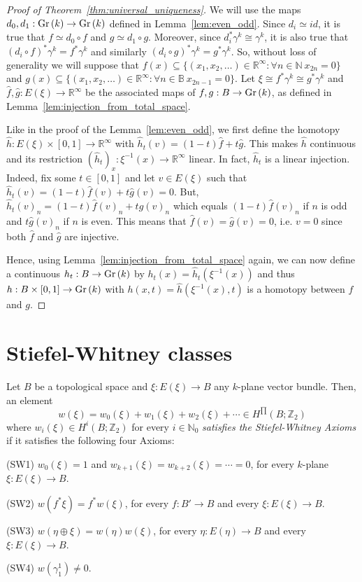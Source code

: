 \begin{proof}[Proof of Theorem~\ref{thm:universal_uniqueness}] We will use the maps $d_0,d_1:\Gr{k}\to\Gr{k}$ defined in Lemma~\ref{lem:even_odd}. Since $d_i\simeq id$, it is true that $f\simeq d_0\circ f$ and $g\simeq d_1\circ g$. Moreover, since $d_i^*\gamma^k\cong\gamma^k$, it is also true that $(d_i\circ f)^*\gamma^k=f^*\gamma^k$ and similarly $(d_i\circ g)^*\gamma^k=g^*\gamma^k$. So, without loss of generality we will suppose that $f(x)\subseteq\{(x_1,x_2,\ldots)\in\mathbb{R}^{\infty}:\forall n\in\mathbb{N}\ x_{2n}=0\}$ and $g(x)\subseteq\{(x_1,x_2,\ldots)\in\mathbb{R}^{\infty}:\forall n\in\mathbb{B}\ x_{2n-1}=0\}$. Let $\xi\cong f^*\gamma^k\cong g^*\gamma^k$ and $\hat{f},\hat{g}:E(\xi)\to\mathbb{R}^{\infty}$ be the associated maps of $f,g:B\to\Gr{k}$, as defined in Lemma~\ref{lem:injection_from_total_space}.

Like in the proof of the Lemma~\ref{lem:even_odd}, we first define the homotopy $\hat{h}:E(\xi)\times[0,1]\to\mathbb{R}^{\infty}$ with $\hat{h}_t(v)=(1-t)\hat{f}+t\hat{g}$. This makes $\hat{h}$ continuous and its restriction $(\hat{h}_t)_x:\xi^{-1}(x)\to\mathbb{R}^{\infty}$ linear. In fact, $\hat{h}_t$ is a linear injection. Indeed, fix some $t\in[0,1]$ and let $v\in E(\xi)$ such that $\hat{h}_t(v)=(1-t)\hat{f}(v)+t\hat{g}(v)=0$. But, $\hat{h}_t(v)_n=(1-t)\hat{f}(v)_n+t\hat{g}(v)_n$ which equals $(1-t)\hat{f}(v)_n$ if $n$ is odd and $t\hat{g}(v)_n$ if $n$ is even. This means that $\hat{f}(v)=\hat{g}(v)=0$, i.e. $v=0$ since both $\hat{f}$ and $\hat{g}$ are injective.

Hence, using Lemma~\ref{lem:injection_from_total_space} again, we can now define a continuous $h_t:B\to\Gr{k}$ by $h_t(x)=\hat{h}_t(\xi^{-1}(x))$ and thus $h:B\times[0,1]\to\Gr{k}$ with $h(x,t)=\hat{h}(\xi^{-1}(x),t)$ is a homotopy between $f$ and $g$.
\end{proof}

\section{Stiefel-Whitney classes}
\begin{axioms} Let $B$ be a topological space and $\xi:E(\xi)\to B$ any $k$-plane vector bundle. Then, an element
\[w(\xi)=w_0(\xi)+w_1(\xi)+w_2(\xi)+\cdots\in H^{\prod}(B;\mathbb{Z}_2)\]
where $w_i(\xi)\in H^i(B;\mathbb{Z}_2)$ for every $i\in\mathbb{N}_0$ \emph{satisfies the Stiefel-Whitney Axioms} if it satisfies the following four Axioms:
\begin{b_item}
\item[(SW1)] $w_0(\xi)=1$ and $w_{k+1}(\xi)=w_{k+2}(\xi)=\cdots=0$, for every $k$-plane $\xi:E(\xi)\to B$.
\item[(SW2)] $w(f^*\xi)=f^*w(\xi)$, for every $f:B'\to B$ and every $\xi:E(\xi)\to B$.
\item[(SW3)] $w(\eta\oplus\xi)=w(\eta)w(\xi)$, for every $\eta:E(\eta)\to B$ and every $\xi:E(\xi)\to B$.
\item[(SW4)] $w(\gamma_1^1)\neq0$.
\end{b_item}
\end{axioms}

